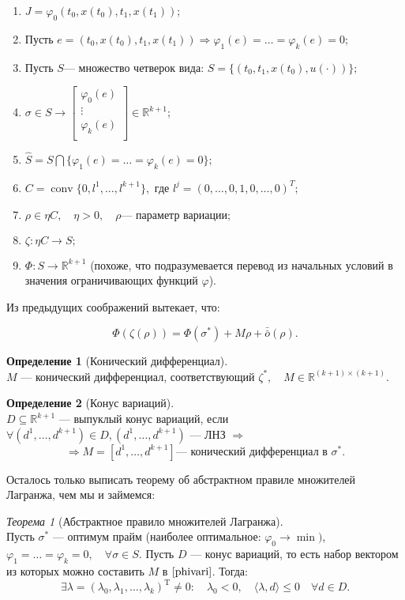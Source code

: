 \documentclass[oneside, final, 14pt, draft]{article}
\theoremstyle{definition}
\theoremstyle{definition}
\newtheorem{defin}{Определение}[section]
\theoremstyle{remark}
\theoremstyle{theorem}
\newtheorem{thm}{Теорема}[section]
\DeclareMathOperator{\conv}{conv}
\renewcommand{\phi}{\varphi}
\renewcommand{\leq}{\leqslant}
\begin{document}
\begin{enumerate}
\item $J = \phi_0(t_0, x(t_0), t_1, x(t_1));$
\item Пусть $e = (t_0, x(t_0), t_1, x(t_1)) \Rightarrow \phi_1(e) = \ldots = \phi_k(e) = 0;$
\item Пусть $S$--- множество четверок вида:
$S = \{(t_0, t_1, x(t_0), u(\cdot))\};$
\item 
$\sigma \in S \rightarrow  \begin{bmatrix}
            \phi_0(e)\\
            \vdots \\
            \phi_k(e)\\
   \end{bmatrix} \in \mathbb{R}^{k+1};$
\item $\hat{S} = S \bigcap \{\phi_1(e) = \ldots = \phi_k(e) = 0\};$
\item $C = \conv \{0, l^1, \ldots, l^{k+1}\}, $ где $ l^j = (0, \ldots, 0, 1, 0, \ldots, 0)^T;$
\item $\rho \in \eta C, \quad \eta>0, \quad \rho \text{--- параметр вариации};$
\item $\zeta: \eta C \rightarrow S;$
\item $\Phi: S \rightarrow \mathbb{R}^{k+1}$ (похоже, что подразумевается перевод из начальных условий в значения ограничивающих функций $\varphi$).
\end{enumerate}
Из предыдущих соображений вытекает, что:

\begin{equation}\label{phivari}
\Phi(\zeta (\rho)) =\Phi(\sigma^*) + M\rho +\bar{\bar{o}}(\rho).
\end{equation}

\begin{defin}[Конический дифференциал]\ \\
$M$ --- конический дифференциал, соответствующий $\zeta^*, \quad M \in \mathbb{R}^{(k+1)\times(k+1)}.$
\end{defin}
\begin{defin}[Конус вариаций]\ \\
$D\subseteq \mathbb{R}^{k+1}$ ---  выпуклый конус вариаций, если $\forall (d^1, \ldots, d^{k+1}) \in D, (d^1, \ldots, d^{k+1})$ --- ЛНЗ $\Rightarrow$
$$\Rightarrow M = [d^1, \ldots, d^{k+1}]\text{--- конический дифференциал в } \sigma^*.$$
\end{defin}
{\flushleft Осталось только выписать теорему об абстрактном правиле множителей Лагранжа, чем мы и займемся:}
\begin{thm}[Абстрактное правило множителей Лагранжа]\ \\
Пусть $\sigma^*$ --- оптимум прайм (наиболее оптимальное: $\phi_0 \rightarrow \min)$, $\phi_1 =\ldots =\phi_k = 0,\quad \forall \sigma \in S.$ Пусть $D$ --- конус вариаций, то есть набор вектором из которых можно составить $M$ в $\eqref{phivari}$. Тогда:
$$\exists \lambda = (\lambda_0, \lambda_1, \ldots, \lambda_k)^\mathrm{T} \neq 0: \quad \lambda_0 < 0, \quad \langle \lambda, d\rangle \leq 0 \quad \forall d \in D.$$
\end{thm}
\end{document}
